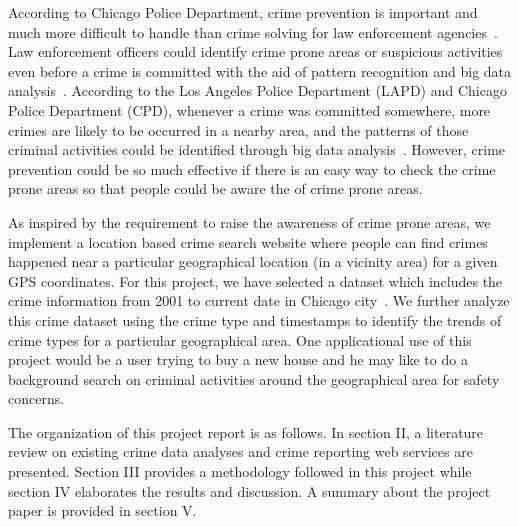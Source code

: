 According to Chicago Police Department, crime prevention is important
and much more difficult to handle than crime solving for law
enforcement agencies~\cite{hid-sp18-409-www-cpd}. Law enforcement
officers could identify crime prone areas or suspicious activities
even before a crime is committed with the aid of pattern recognition
and big data analysis~\cite{hid-sp18-409-nath2006crime,
hid-sp18-409-gera2014city}.  According to the Los Angeles Police
Department (LAPD) and Chicago Police Department (CPD), whenever a
crime was committed somewhere, more crimes are likely to be occurred
in a nearby area, and the patterns of those criminal activities could
be identified through big data analysis~\cite{hid-sp18-409-www-cpd,
hid-sp18-409-www-lapd}. However, crime prevention could be so much
effective if there is an easy way to check the crime prone areas so
that people could be aware the of crime prone areas.

As inspired by the requirement to raise the awareness of crime prone
areas, we implement a location based crime search website where people
can find crimes happened near a particular geographical location (in a
vicinity area) for a given GPS coordinates. For this project, we have
selected a dataset which includes the crime information from 2001 to
current date in Chicago city~\cite{hid-sp18-409-www-data.gov}. We
further analyze this crime dataset using the crime type and timestamps to
identify the trends of crime types for a particular
geographical area. One applicational use of this project would be a
user trying to buy a new house and he may like to do a background
search on criminal activities around the geographical area for safety
concerns.

The organization of this project report is as follows. In section II,
a literature review on existing crime data analyses and crime
reporting web services are presented. Section III provides a
methodology followed in this project while section IV elaborates the
results and discussion. A summary about the project paper is provided
in section V.

